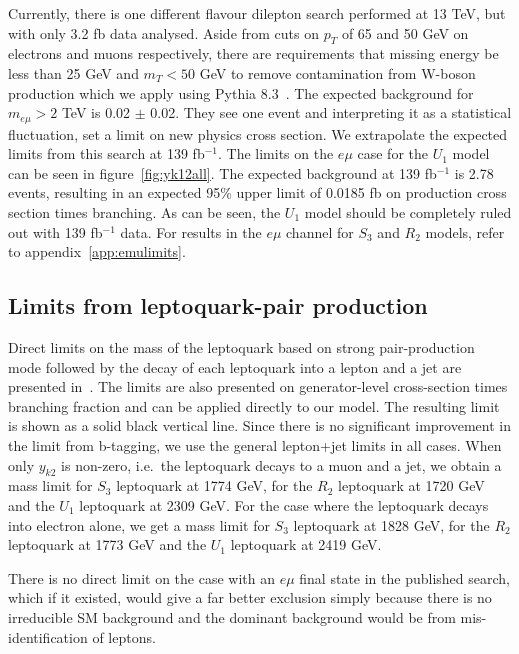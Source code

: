 \documentclass[12pt]{revtex4-2}
\numberwithin{equation}{section}
\begin{document}
Currently, there is one different flavour dilepton search \cite{ATLAS:2016loq} performed at 13 TeV, but with only 3.2 fb data analysed.  Aside from cuts on $p_T$ of 65 and 50 GeV on electrons and muons respectively, there are requirements that missing energy be less than 25 GeV and $m_T < 50 $ GeV to remove contamination from W-boson production which we apply using Pythia 8.3~\cite{Bierlich:2022pfr}.  The expected background for $m_{e \mu} > 2 $ TeV is 0.02 $\pm$ 0.02.  They see one event and interpreting it as a statistical fluctuation, set a limit on new physics cross section.  We extrapolate the expected limits from this search at 139 fb$^{-1}$. The limits on the $e\mu$ case for the $U_1$ model can be seen in figure~\ref{fig:yk12all}.  The expected background at 139 fb$^{-1}$ is 2.78 events, resulting in an expected 95\% upper limit of 0.0185 fb on production cross section times branching.  As can be seen, the $U_1$ model should be completely ruled out with 139 fb$^{-1}$ data.  For results in the $e\mu$ channel for $S_3$ and $R_2$ models, refer to appendix~\ref{app:emulimits}.


\subsection{Limits from leptoquark-pair production}

Direct limits on the mass of the leptoquark based on strong pair-production mode followed by the decay of each leptoquark into a lepton and a jet are presented in~\cite{ATLAS:2020dsk}. The limits are also presented on generator-level cross-section times branching fraction and can be applied directly to our model.  The resulting limit is shown as a solid black vertical line.  Since there is no significant improvement in the limit from b-tagging, we use the general lepton+jet limits in all cases.  When only $y_{k2}$ is non-zero, i.e.\, the leptoquark decays to a muon and a jet, we obtain a mass limit for $S_3$ leptoquark at 1774 GeV, for the $R_2$ leptoquark at 1720 GeV and the $U_1$ leptoquark at 2309 GeV.  For the case where the leptoquark decays into electron alone, we get a mass limit for $S_3$ leptoquark at 1828 GeV, for the $R_2$ leptoquark at 1773 GeV and the $U_1$ leptoquark at 2419 GeV.  

There is no direct limit on the case with an $e\mu$ final state in the published search, which if it existed, would give a far better exclusion simply because there is no irreducible SM background and the dominant background would be from mis-identification of leptons.
\end{document}
